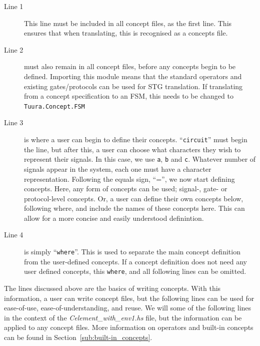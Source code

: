 \documentclass[british,technote,compsoc]{IEEEtran}
\begin{document}
\begin{description}
  \item [Line 1]
  This line must be included in all concept files, as the first line. This ensures that when translating, this is recognised as a concepts file.
  
  \item [Line 2] must also remain in all concept files, before any concepts begin to be defined. 
                       Importing this module means that the standard operators and existing gates/protocols can be used for STG translation.
                       If translating from a concept specification to an FSM, this needs to be changed to \texttt{Tuura.Concept.FSM}
  
  \item [Line 3] is where a user can begin to define their concepts. ``\texttt{circuit}'' must begin the line, but after this, a user can choose what characters they wish to represent their 
  signals. In this case, we use \texttt{a}, \texttt{b} and \texttt{c}. Whatever number of signals appear in the system, each one must have a character representation. Following the equals 
  sign, ``='', we now start defining concepts. Here, any form of concepts can be used; signal-, gate- or protocol-level concepts. Or, a user can define their own concepts below, following 
  where, and include the names of these concepts here. This can allow for a more concise and easily understood definintion.
  
  \item [Line 4] is simply ``\texttt{where}''. This is used to separate the main concept definition from the user-defined concepts. If a concept definition does not need any user defined 
  concepts, this \texttt{where}, and all following lines can be omitted.

\end{description}

\noindent The lines discussed above are the basics of writing concepts. With this information, a user can write concept files, but the following lines can be used for ease-of-use, ease-of-understanding, 
and reuse. We will some of the following lines in the context of the \emph{Celement\_with\_env1.hs} file, but the information can be applied to any concept files. More information on 
operators and built-in concepts can be found in Section~\ref{sub:built-in_concepts}.
\end{document}
